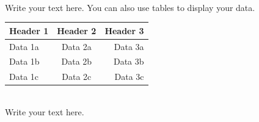 \documentclass[12pt]{article}
\begin{document}
\vskip0.1in
\\

Write your text here.  You can also use tables to display your data.\\








\begin{center}
\begin{tabular}{lcr}\hline\hline
Header 1 & Header 2 & Header 3 \\\hline\hline
Data 1a   & Data 2a   &  Data 3a    \\
Data 1b   & Data 2b  &  Data 3b    \\
Data 1c   & Data 2c   &  Data 3c    \\\hline
\end{tabular}\vskip 0.2in
\end{center}


\vskip0.1in
\\

Write your text here.


\end{document}
